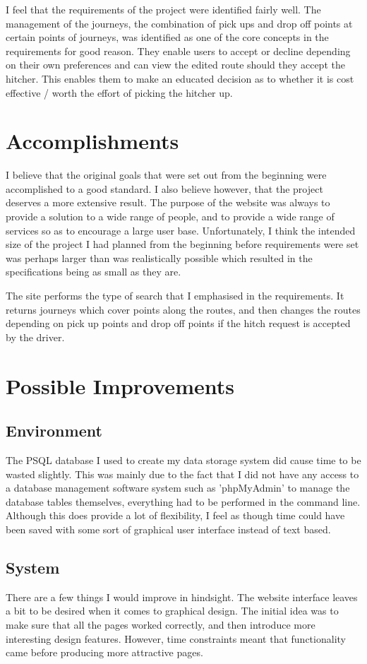 I feel that the requirements of the project were identified fairly well. The management of the journeys, the combination of pick ups and drop off points at certain points of journeys, was identified as one of the core concepts in the requirements for good reason. They enable users to accept or decline depending on their own preferences and can view the edited route should they accept the hitcher. This enables them to make an educated decision as to whether it is cost effective / worth the effort of picking the hitcher up.

\section{Accomplishments}
I believe that the original goals that were set out from the beginning were accomplished to a good standard. I also believe however, that the project deserves a more extensive result. The purpose of the website was always to provide a solution to a wide range of people, and to provide a wide range of services so as to encourage a large user base. Unfortunately, I think the intended size of the project I had planned from the beginning before requirements were set was perhaps larger than was realistically possible which resulted in the specifications being as small as they are. 

The site performs the type of search that I emphasised in the requirements. It returns journeys which cover points along the routes, and then changes the routes depending on pick up points and drop off points if the hitch request is accepted by the driver. 

\section{Possible Improvements}
\subsection{Environment}
The PSQL database I used to create my data storage system did cause time to be wasted slightly. This was mainly due to the fact that I did not have any access to a database management software system such as 'phpMyAdmin'\cite{php_my_admin} to manage the database tables themselves, everything had to be performed in the command line. Although this does provide a lot of flexibility, I feel as though time could have been saved with some sort of graphical user interface instead of text based.

\subsection{System}
There are a few things I would improve in hindsight. The website interface leaves a bit to be desired when it comes to graphical design. The initial idea was to make sure that all the pages worked correctly, and then introduce more interesting design features. However, time constraints meant that functionality came before producing more attractive pages.

